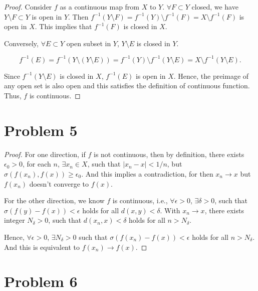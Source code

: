 \documentclass[12pt]{article}
\begin{document}
\begin{proof}

Consider $f$ as a continuous map from $X$ to $Y$. $\forall F \subset Y$ closed, we have $Y \setminus F \subset Y$ is open in $Y$. Then $f^{-1} (Y\setminus F) = f^{-1}(Y)\setminus f^{-1}(F) = X\setminus f^{-1}(F)$ is open in $X$. This implies that $f^{-1}(F)$ is closed in $X$.

Conversely, $\forall E \subset Y$ open subset in $Y$, $Y\setminus E$ is closed in $Y$. 

$$
f^{-1}(E) = f^{-1}(Y\setminus (Y\setminus E)) = f^{-1}(Y) \setminus f^{-1}(Y\setminus E) = X \setminus f^{-1}(Y\setminus E).
$$

Since $f^{-1}(Y\setminus E)$ is closed in $X$, $f^{-1}(E)$ is open in $X$. Hence, the preimage of any open set is also open and this satisfies the definition of continuous function. Thus, $f$ is continuous. 

\end{proof}


\section*{Problem 5}

\begin{proof}

For one direction, if $f$ is not continuous, then by definition, there exists $\epsilon_0 > 0$, for each $n$, $\exists x_n \in X$, such that $|x_n - x| < 1/n$, but $\sigma (f(x_n), f(x)) \geqslant \epsilon_0$. And this implies a contradiction, for then $x_n \rightarrow x$ but $f(x_n)$ doesn't converge to $f(x)$.

For the other direction, we know $f$ is continuous, i.e.,  $\forall \epsilon > 0$, $\exists \delta > 0$, such that $\sigma (f(y) - f(x)) < \epsilon$ holds for all $d(x, y) < \delta$. With $x_n \rightarrow x$, there exists integer $N_\delta > 0$, such that $d(x_n , x) < \delta$ holds for all $n > N_\delta$.

Hence, $\forall \epsilon > 0$, $\exists N_\delta > 0$ such that $\sigma (f(x_n) - f(x)) < \epsilon$ holds for all $n > N_\delta$. And this is equivalent to $f(x_n) \rightarrow f(x)$.

\end{proof}


\section*{Problem 6}
\end{document}
